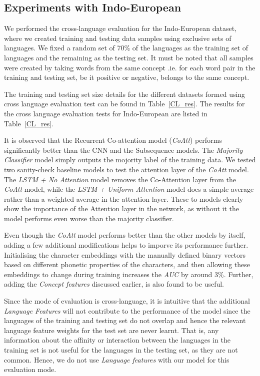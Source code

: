 \documentclass[11pt,letterpaper]{article}
\begin{document}
\subsection{Experiments with Indo-European}

We performed the cross-language evaluation for the Indo-European dataset, where we created training and testing data samples using exclusive sets of languages. We fixed a random set of 70\% of the languages as the training set of languages and the remaining as the testing set. It must be noted that all samples were created by taking words from the same concept .ie. for each word pair in the training and testing set, be it positive or negative, belongs to the same concept.

The training and testing set size details for the different datasets formed using cross language evaluation test can be found in Table~\ref{CL_res}. The results for the cross language evaluation tests for Indo-European are listed in Table~\ref{CL_res}. 

It is observed that the Recurrent Co-attention model (\textit{CoAtt}) performs significantly better than the CNN and the Subsequence models. The \textit{Majority Classifier} model simply outputs the mojority label of the training data. We tested two sanity-check baseline models to test the attention layer of the \textit{CoAtt} model.  The \textit{LSTM + No Attention} model removes the Co-Attention layer from the \textit{CoAtt} model, while the \textit{LSTM + Uniform Attention} model does a simple average rather than a weighted average in the attention layer. These to models clearly show the importance of the Attention layer in the network, as without it the model performs even worse than the majority classifier.

Even though the \textit{CoAtt} model performs better than the other models by itself, adding a few additional modifications helps to imporve its performance further. Initialising the character embeddings with the manually defined binary vectors based on different phonetic properties of the characters, and then allowing these embeddings to change during training increases the \textit{AUC} by around 3\%. Further, adding the \textit{Concept features} discussed earlier, is also found to be useful.

Since the mode of evaluation is cross-language, it is intuitive that the additional \textit{Language Features} will not contribute to the performance of the model since the languages of the training and testing set do not overlap and hence the relevant language feature weights for the test set are never learnt. That is, any information about the affinity or interaction between the languages in the training set is not useful for the languages in the testing set, as they are not common. Hence, we do not use \textit{Language features} with our model for this evaluation mode.
\end{document}
